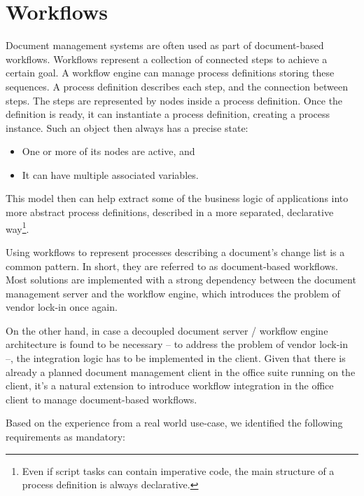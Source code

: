 \section{Workflows}

Document management systems are often used as part of document-based workflows.
Workflows represent a collection of connected steps to achieve a certain goal.
A workflow engine can manage process definitions storing these sequences. A
process definition describes each step, and the connection between steps. The
steps are represented by nodes inside a process definition. Once the definition
is ready, it can instantiate a process definition, creating a process instance.
Such an object then always has a precise state:

\begin{itemize}
\item One or more of its nodes are active, and
\item It can have multiple associated variables.
\end{itemize}

This model then can help extract some of the business logic of applications
into more abstract process definitions, described in a more separated,
declarative way\footnote{Even if script tasks can contain imperative code, the
main structure of a process definition is always declarative.}.

Using workflows to represent processes describing a document's change list is a
common pattern. In short, they are referred to as
document-based workflows. Most solutions are implemented with a strong
dependency between the document management server and the workflow engine,
which introduces the problem of vendor lock-in once again.

On the other hand, in case a decoupled document server / workflow engine
architecture is found to be necessary -- to address the problem of vendor
lock-in --, the integration logic has to be implemented in the client. Given
that there is already a planned document management client in the office suite
running on the client, it's a natural extension to introduce workflow
integration in the office client to manage document-based workflows.

Based on the experience from a real world use-case, we identified the following
requirements as mandatory:

